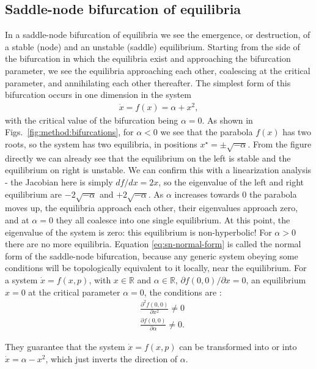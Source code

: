 \subsection{Saddle-node bifurcation of equilibria}
In a saddle-node bifurcation of equilibria we see the emergence, or destruction, of a stable (node) and an unstable (saddle) equilibrium. Starting from the side of the bifurcation in which the equilibria exist and approaching the bifurcation parameter, we see the equilibria approaching each other, coalescing at the critical parameter, and annihilating each other thereafter. The simplest form of this bifurcation occurs in one dimension in the system 
%
\begin{align}
    \dot{x} = f(x) = \alpha + x^2,
    \label{eq:sn-normal-form}
\end{align}
%
with the critical value of the bifurcation being $\alpha = 0$. As shown in Figs.~\ref{fig:method:bifurcations}, for $\alpha < 0$ we see that the parabola $f(x)$ has two roots, so the system has two equilibria, in positions $x^\star = \pm \sqrt{-\alpha}$. From the figure directly we can already see that the equilibrium on the left is stable and the equilibrium on right is unstable. We can confirm this with a linearization analysis - the Jacobian here is simply $df/dx = 2x$, so the eigenvalue of the left and right equilibrium are $-2\sqrt{-\alpha}$ and $+2\sqrt{-\alpha}$.   As $\alpha$ increases towards $0$ the parabola moves up, the equilibria approach each other, their eigenvalues approach zero, and at $\alpha=0$ they all coalesce into one single equilibrium. At this point, the eigenvalue of the system is zero: this equilibrium is non-hyperbolic! For $\alpha > 0$ there are no more equilibria. Equation \ref{eq:sn-normal-form} is called the normal form of the saddle-node bifurcation, because any generic system obeying some conditions will be topologically equivalent to it locally, near the equilibrium. For a system $\dot{x} = f(x,p)$, with $x \in \mathbb{R}$ and $\alpha \in \mathbb{R}$, $\partial f(0,0) / \partial x = 0$, an equilibrium $x = 0$ at the critical parameter $\alpha = 0$, the conditions are \cite{kuznetsov}:
%
\begin{align}
    &\frac{\partial^2 f(0, 0)}{\partial x^2} \neq 0 \\ 
    &\frac{\partial f(0, 0)}{\partial \alpha} \neq 0.
\end{align}

They guarantee that the system $\dot{x} = f(x,p)$ can be transformed into  or into $\dot{x} = \alpha - x^2$, which just inverts the direction of $\alpha$. 

